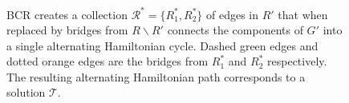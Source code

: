 \documentclass[authoryear]{elsarticle}
\begin{document}
\begin{comment}
BCR procures the bridges from a collection $\mathcal{R}^*$ covering all components of $G'$ by operating on each set $R^*_i \subset \mathcal{R}^*$ as follows: for each edge in $R^*_i$ in turn, the edge from $R \backslash R'$ connecting the smaller vertex of the edge to the larger vertex of the next edge is added to $R'$. These edges are bridges, connecting the different components together. The edges in $\mathcal{R}^*$ are then removed from $R'$, so that $|R'| = n+1$. Figure~\ref{fig:bcr} shows how BCR performs on our example instance, where the sets $R^*_1 = \{(v_2, v_{17}),(v_3, v_{16}), (v_4, v_{15})\}$ and $R^*_2 = \{(v_7, v_{12}), (v_8, v_{11})\}$ of successive edges in $\mathcal{L}$ that meet the required conditions have been formed. As $\mathcal{R}^* =\{R^*_1, R^*_2\}$ covers all four components of $G'$ no more sets are required, and BCR uses $\mathcal{R}^*$ to acquire the bridges from $R\backslash R'$, as demonstrated in Fig.~\ref{fig:bcrlist}. These bridges are added to the set $R'$, linking the components of $G'$, and replace the edges in $R'$ that appear in $\mathcal{R}^*$, shown in Figs.~\ref{fig:mpsconnect}--\ref{fig:mpscycle}. This modified matching $R'$ is able to form an alternating Hamiltonian cycle in $G'$ with the edge set $B$. Removing the universal vertices yields an alternating Hamiltonian path which corresponds to a feasible solution $\mathcal{T}$ (Fig.~\ref{fig:solutionpath}).
\end{comment}

\begin{figure}[H]	
	\centering
	\begin{subfigure}[h]{0.35\textwidth}
		
		\caption{}
		\label{fig:bcrlist}
	\end{subfigure} \hspace{7mm} %
	\begin{subfigure}[h]{0.25\textwidth}
		
		\caption{}
		\label{fig:mpsconnect}
	\end{subfigure} \hspace{7mm} %
	\begin{subfigure}[h]{0.25\textwidth}
		
		\caption{}
		\label{fig:mpscycle}
	\end{subfigure}
	\begin{subfigure}[h]{0.75\textwidth}
		
		\caption{}
		\label{fig:solutionpath}
	\end{subfigure}
	\caption{BCR creates a collection $\mathcal{R}^* = \{R^*_1, R^*_2\}$ of edges in $R'$ that when replaced by bridges from $R\backslash R'$ connects the components of $G'$ into a single alternating Hamiltonian cycle. Dashed green edges and dotted orange edges are the bridges from $R^*_1$ and $R^*_2$ respectively. The resulting alternating Hamiltonian path corresponds to a solution $\mathcal{T}$.}
	\label{fig:bcr}
\end{figure}
\end{document}
